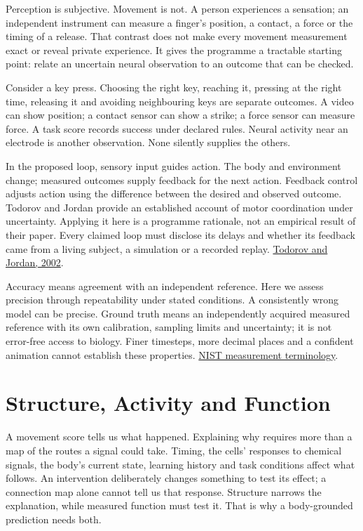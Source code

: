 Perception is subjective. Movement is not. A person experiences a sensation; an independent instrument can measure a finger's position, a contact, a force or the timing of a release. That contrast does not make every movement measurement exact or reveal private experience. It gives the programme a tractable starting point: relate an uncertain neural observation to an outcome that can be checked.\par

Consider a key press. Choosing the right key, reaching it, pressing at the right time, releasing it and avoiding neighbouring keys are separate outcomes. A video can show position; a contact sensor can show a strike; a force sensor can measure force. A task score records success under declared rules. Neural activity near an electrode is another observation. None silently supplies the others.\par

In the proposed loop, sensory input guides action. The body and environment
change; measured outcomes supply feedback for the next action. Feedback control
adjusts action using the difference between the desired and observed outcome.
Todorov and Jordan provide an established account of motor coordination under
uncertainty. Applying it here is a programme rationale, not an empirical result
of their paper. Every claimed loop must disclose its delays and whether its
feedback came from a living subject, a simulation or a recorded replay.
\href{https://www.nature.com/articles/nn963}{Todorov and Jordan, 2002}.\par

Accuracy means agreement with an independent reference. Here we assess precision through repeatability under stated conditions. A consistently wrong model can be precise. Ground truth means an independently acquired measured reference with its own calibration, sampling limits and uncertainty; it is not error-free access to biology. Finer timesteps, more decimal places and a confident animation cannot establish these properties. \href{https://www.nist.gov/pml/nist-technical-note-1297/nist-tn-1297-appendix-d1-terminology}{NIST measurement terminology}.\par

\section{Structure, Activity and Function}

A movement score tells us what happened. Explaining why requires more than a map of the routes a signal could take. Timing, the cells' responses to chemical signals, the body's current state, learning history and task conditions affect what follows. An intervention deliberately changes something to test its effect; a connection map alone cannot tell us that response. Structure narrows the explanation, while measured function must test it. That is why a body-grounded prediction needs both.\par

